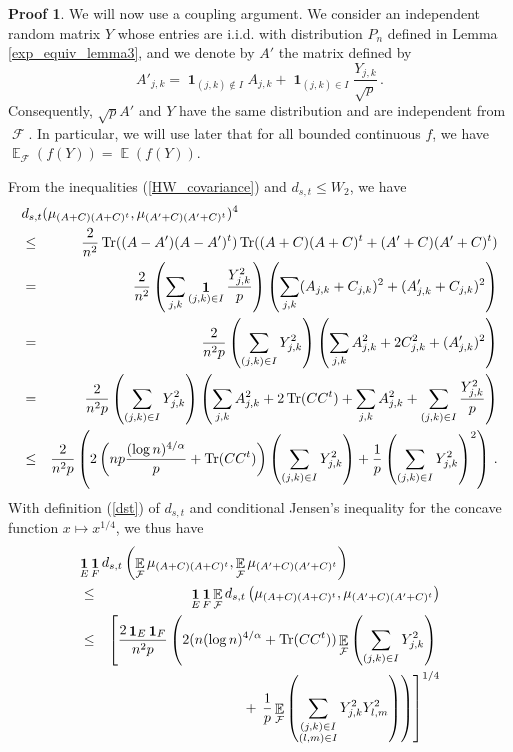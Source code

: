 \documentclass[11pt,a4paper]{article}
\DeclareMathOperator{\E}{\mathbb{E}}
\DeclareMathOperator{\FF}{\mathcal{F}}
\DeclareMathOperator{\1}{\mathbf{1}}
\DeclareMathOperator{\Tr}{\mathrm{Tr}}
\theoremstyle{definition}
\newtheorem*{Proof}{Proof}
\begin{document}
\begin{Proof}
We will now use a coupling argument. We consider an independent random matrix $Y$ whose entries are i.i.d. with distribution $P_n$ defined in Lemma \ref{exp_equiv_lemma3}, and we denote by $A'$ the matrix defined by
\begin{displaymath}
A'_{j,k} = \1_{(j,k) \notin I} A_{j,k} + \1_{(j,k) \in I} \frac{Y_{j,k}}{\sqrt{p}} \, .
\end{displaymath}
Consequently, $\sqrt{p}A'$ and $Y$ have the same distribution and are independent from $\FF$. In particular, we will use later that for all bounded continuous $f$, we have $\E_{\FF}(f(Y)) = \E(f(Y))$.

From the inequalities (\ref{HW_covariance}) and $d_{s,t} \le W_2$, we have
\begin{eqnarray*}
\lefteqn{   d_{s,t} (\mu_{(A+C)(A+C)^t} , \mu_{(A'+C)(A'+C)^t})^4   } \\
& \le & \frac{2}{n^2} \Tr((A-A')(A-A')^t) \Tr((A+C)(A+C)^t + (A'+C)(A'+C)^t) \\
& = & \frac{2}{n^2} \left( \sum_{j,k} \1_{(j,k) \in I} \frac{Y_{j,k}^2}{p} \right) \left( \sum_{j,k} (A_{j,k}+C_{j,k})^2 + (A'_{j,k}+C_{j,k})^2 \right) \\
& = & \frac{2}{n^2p} \left( \sum_{(j,k) \in I} Y_{j,k}^2 \right) \left( \sum_{j,k} A_{j,k}^2 + 2C_{j,k}^2 + (A'_{j,k})^2 \right) \\
& = & \frac{2}{n^2p} \left( \sum_{(j,k) \in I} Y_{j,k}^2 \right) \left( \sum_{j,k} A_{j,k}^2 + 2 \Tr(CC^t) + \sum_{j,k} A_{j,k}^2 + \sum_{(j,k) \in I} \frac{Y_{j,k}^2}{p} \right) \\
& \le & \frac{2}{n^2p} \left( 2 \left( np \frac{(\log n)^{4/\alpha}}{p} + \Tr(CC^t) \right) \left( \sum_{(j,k) \in I} Y_{j,k}^2 \right) + \frac1p \left( \sum_{(j,k) \in I} Y_{j,k}^2 \right)^2 \right) \, .
\end{eqnarray*}
With definition (\ref{dst}) of $d_{s,t}$ and conditional Jensen's inequality for the concave function $x \mapsto x^{1/4}$, we thus have
\begin{eqnarray*}
\lefteqn{  \1_E \1_F d_{s,t} \left( \E_{\FF} \mu_{(A+C)(A+C)^t} , \E_{\FF} \mu_{(A'+C)(A'+C)^t} \right)  } \\
& \le & \1_E \1_F \E_{\FF} d_{s,t} \left( \mu_{(A+C)(A+C)^t} , \mu_{(A'+C)(A'+C)^t} \right) \\
& \le & \left[ \frac{2 \1_E \1_F}{n^2p} \left( 2(n(\log n)^{4/\alpha} + \Tr(CC^t)) \E_{\FF} \left( \sum_{(j,k) \in I} Y_{j,k}^2 \right) \right. \right. \\
& & + \left. \left. \frac1p \E_{\FF} \left( \sum_{\substack{(j,k) \in I \\ (l,m) \in I}} Y_{j,k}^2 Y_{l,m}^2 \right) \right) \right]^{1/4}

\end{eqnarray*}
\end{Proof}
\end{document}
